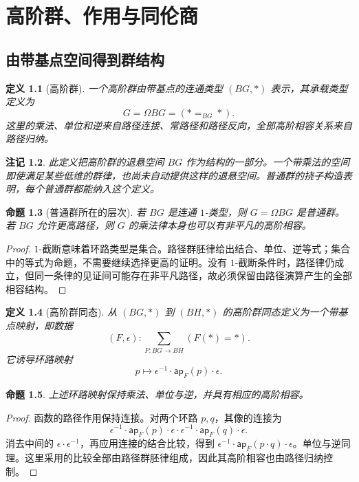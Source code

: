 \documentclass[12pt,oneside,openany,fontset=none]{ctexbook}
\theoremstyle{cn}
\newtheorem{definition}{定义}[chapter]
\newtheorem{proposition}[definition]{命题}
\newtheorem{remark}[definition]{注记}
\numberwithin{equation}{chapter}
\newcommand{\ap}{\mathsf{ap}}
\begin{document}
\chapter{高阶群、作用与同伦商}
\section{由带基点空间得到群结构}
\begin{definition}[高阶群]
一个高阶群由带基点的连通类型 $(BG,*)$ 表示，其承载类型定义为
\[
G=\Omega BG=(*=_{BG}*).
\]
这里的乘法、单位和逆来自路径连接、常路径和路径反向，全部高阶相容关系来自路径归纳。
\end{definition}
\begin{remark}
此定义把高阶群的退悬空间 $BG$ 作为结构的一部分。一个带乘法的空间即使满足某些低维的群律，也尚未自动提供这样的退悬空间。普通群的挠子构造表明，每个普通群都能纳入这个定义。
\end{remark}
\begin{proposition}[普通群所在的层次]
若 $BG$ 是连通 $1$-类型，则 $G=\Omega BG$ 是普通群。若 $BG$ 允许更高路径，则 $G$ 的乘法律本身也可以有非平凡的高阶相容。
\end{proposition}
\begin{proof}
$1$-截断意味着环路类型是集合。路径群胚律给出结合、单位、逆等式；集合中的等式为命题，不需要继续选择更高的证明。没有 $1$-截断条件时，路径律仍成立，但同一条律的见证间可能存在非平凡路径，故必须保留由路径演算产生的全部相容结构。
\end{proof}
\begin{definition}[高阶群同态]
从 $(BG,*)$ 到 $(BH,*)$ 的高阶群同态定义为一个带基点映射，即数据
\[
(F,\epsilon):\sum_{F:BG\to BH}(F(*)=*).
\]
它诱导环路映射
\[
p\longmapsto\epsilon^{-1}\cdot\ap_F(p)\cdot\epsilon.
\]
\end{definition}
\begin{proposition}
上述环路映射保持乘法、单位与逆，并具有相应的高阶相容。
\end{proposition}
\begin{proof}
函数的路径作用保持连接。对两个环路 $p,q$，其像的连接为
\[
\epsilon^{-1}\cdot\ap_F(p)\cdot\epsilon
\cdot\epsilon^{-1}\cdot\ap_F(q)\cdot\epsilon.
\]
消去中间的 $\epsilon\cdot\epsilon^{-1}$，再应用连接的结合比较，得到 $\epsilon^{-1}\cdot\ap_F(p\cdot q)\cdot\epsilon$。单位与逆同理。这里采用的比较全部由路径群胚律组成，因此其高阶相容也由路径归纳控制。
\end{proof}
\end{document}
